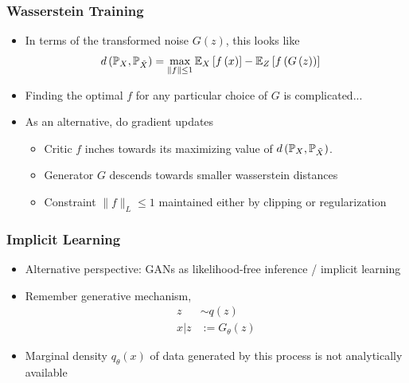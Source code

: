 \documentclass[10pt,mathserif]{beamer}
\begin{document}
\begin{frame}
  \frametitle{Wasserstein Training}
  \begin{itemize}
  \item In terms of the transformed noise $G\left(z\right)$, this looks like
    \begin{align*}
      d\left(\P_{X}, \P_{\tilde{X}}\right) &= \max_{\|f\| \leq 1} \Esubarg{X}{f\left(x\right)} - \Esubarg{Z}{f\left(G\left(z\right)\right)}
    \end{align*}
  \item Finding the optimal $f$ for any particular choice of $G$ is complicated...
  \item As an alternative, do gradient updates
  \begin{itemize}
  \item Critic $f$ inches towards its maximizing value of $d\left(\P_{X},
    \P_{\tilde{X}}\right)$.
  \item Generator $G$ descends towards smaller wasserstein distances
  \item Constraint $\|f\|_{L} \leq 1$ maintained either by clipping or
    regularization
  \end{itemize}
\end{itemize}
\end{frame}

\begin{frame}
  \frametitle{Implicit Learning}
  \begin{itemize}
  \item Alternative perspective: GANs as likelihood-free inference / implicit
    learning
  \item Remember generative mechanism,
    \begin{align*}
      z &\sim q\left(z\right) \\
      x \vert z &:= G_{\theta}\left(z\right)
    \end{align*}
  \item Marginal density $q_{\theta}\left(x\right)$ of data generated by this
    process is not analytically available
  \end{itemize}
\end{frame}
\end{document}
